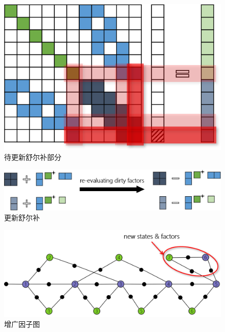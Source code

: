 \begin{figure}[htb]
    \centering
    \includegraphics{figs/normal_eq_cursed.png}
    \caption{待更新舒尔补部分}
\end{figure}

\begin{figure}[htb]
    \centering
    \includegraphics[width=\textwidth]{figs/schur_update.png}
    \caption{更新舒尔补}
\end{figure}

\begin{figure}[htb]
    \centering
    \includegraphics[width=.8\textwidth]{figs/factor_graph_aug.png}
    \caption{增广因子图}
\end{figure}

